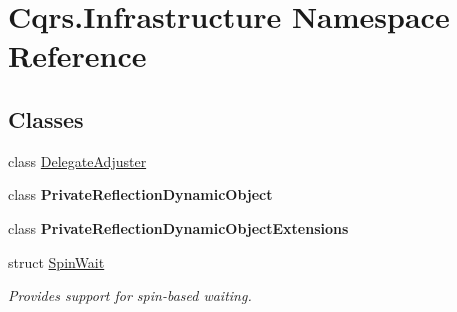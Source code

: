 \hypertarget{namespaceCqrs_1_1Infrastructure}{}\section{Cqrs.\+Infrastructure Namespace Reference}
\label{namespaceCqrs_1_1Infrastructure}
\subsection*{Classes}
\begin{DoxyCompactItemize}
\item 
class \hyperlink{classCqrs_1_1Infrastructure_1_1DelegateAdjuster}{Delegate\+Adjuster}
\item 
class {\bfseries Private\+Reflection\+Dynamic\+Object}
\item 
class {\bfseries Private\+Reflection\+Dynamic\+Object\+Extensions}
\item 
struct \hyperlink{structCqrs_1_1Infrastructure_1_1SpinWait}{Spin\+Wait}
\begin{DoxyCompactList}\small\item\em Provides support for spin-\/based waiting. \end{DoxyCompactList}\end{DoxyCompactItemize}
